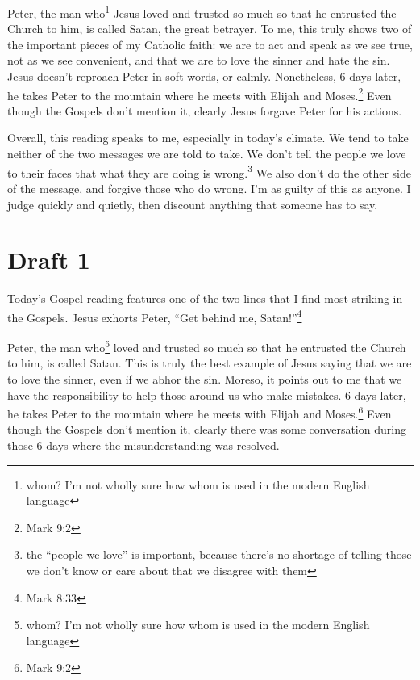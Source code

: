 \documentclass[12pt]{article}[titlepage]
\newcommand{\say}[1]{``#1''}
\newcommand{\1}{\={a}}
\newcommand{\2}{\={e}}
\newcommand{\3}{\={\i}}
\newcommand{\4}{\=o}
\newcommand{\5}{\=u}
\newcommand{\6}{\={A}}
\renewcommand{\,}{\textsuperscript{,}}
\begin{document}
Peter, the man who\footnote{whom? I'm not wholly sure how whom is used in the modern English language} Jesus loved and trusted so much so that he entrusted the Church to him, is called Satan, the great betrayer.
To me, this truly shows two of the important pieces of my Catholic faith: we are to act and speak as we see true, not as we see convenient, and that we are to love the sinner and hate the sin.
Jesus doesn't reproach Peter in soft words, or calmly.
Nonetheless, 6 days later, he takes Peter to the mountain where he meets with Elijah and Moses.\footnote{Mark 9:2}
Even though the Gospels don't mention it, clearly Jesus forgave Peter for his actions.

Overall, this reading speaks to me, especially in today's climate.
We tend to take neither of the two messages we are told to take.
We don't tell the people we love to their faces that what they are doing is wrong.\footnote{the \say{people we love} is important, because there's no shortage of telling those we don't know or care about that we disagree with them}
We also don't do the other side of the message, and forgive those who do wrong.
I'm as guilty of this as anyone.
I judge quickly and quietly, then discount anything that someone has to say.

\section{Draft 1}
Today's Gospel reading features one of the two lines that I find most striking in the Gospels.
Jesus exhorts Peter, \say{Get behind me, Satan!}\footnote{Mark 8:33}

Peter, the man who\footnote{whom? I'm not wholly sure how whom is used in the modern English language} loved and trusted so much so that he entrusted the Church to him, is called Satan.
This is truly the best example of Jesus saying that we are to love the sinner, even if we abhor the sin.
Moreso, it points out to me that we have the responsibility to help those around us who make mistakes.
6 days later, he takes Peter to the mountain where he meets with Elijah and Moses.\footnote{Mark 9:2}
Even though the Gospels don't mention it, clearly there was some conversation during those 6 days where the misunderstanding was resolved.
\end{document}

